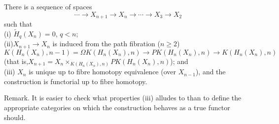 \begin{prop}
  There is a sequence of spaces
  \[\cdots \longrightarrow  X_{n+1}\longrightarrow  X_n \longrightarrow  \cdots\longrightarrow  X_3 \longrightarrow X_2\]
  such that\\
  (i) $\widetilde{H}_q(X_n)=0$, $q<n$;\\
  (ii)$X_{n+1}\longrightarrow X_n$ is induced from the path fibration ($n\geqslant 2$)
  \[K(H_n(X_n),n-1)=\Omega K(H_n(X_n),n)\longrightarrow PK(H_n(X_n),n) \longrightarrow K(H_n(X_n),n)\]
  (that is,$X_{n+1}=X_n \times_{K(H_n(X_n),n)} PK(H_n(X_n),n)$); and \\
(iii) $X_n$ is unique up to fibre homotopy equivalence (over $X_{n-1}$), and the construction is functorial up to fibre homotopy.
\end{prop}
Remark. It is easier to check what properties (iii) alludes to than to define the appropriate categories on which the construction behaves as a true functor should.
